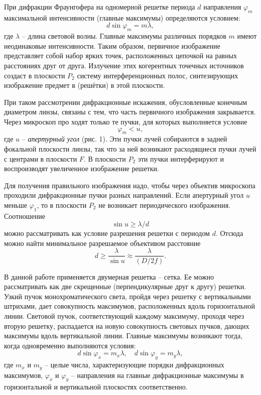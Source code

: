\documentclass[a4paper,12pt]{article}
\begin{document}
При дифракции Фраунгофера на одномерной решетке периода $d$ направления $\varphi_m$ 
 максимальной интенсивности (главные максимумы) определяются условием:
\begin{equation}\label{eq: max condition Fraunhofer diffraction}
     d\sin\varphi_m = m\lambda,
\end{equation}
где $\lambda$ -- длина световой волны. Главные максимумы различных порядков $m$ имеют неодинаковые интенсивности. Таким образом, первичное изображение представляет собой набор ярких точек, расположенных цепочкой на равных расстояниях друг от друга. Излучение этих когерентных точечных источников создаст в плоскости $P_2$ систему интерференционных полос, синтезирующих изображение предмет в (решётки) в этой плоскости.

При таком рассмотрении дифракционные искажения, обусловленные конечным диаметром линзы, связаны с тем, что часть первичного изображения закрывается. Через микроскоп про ходят только те пучки, для которых выполняется условие
\begin{equation}\label{eq: microscope aperture}
     \varphi_m < u,
\end{equation}
где $u$ -- \textit{апертурный угол} (рис. 1). Эти пучки лучей собираются в задней фокальной плоскости линзы, так что за ней возникают расходящиеся пучки лучей с центрами в плоскости $F$. В плоскости $P_2$ эти пучки интерферируют и воспроизводят увеличенное изображение решетки.

Для получения правильного изображения надо, чтобы через объектив микроскопа проходили дифракционные пучки разных направлений. Если апертурный угол $u$ меньше $\varphi_1$, то в плоскости $P_2$ не возникает периодического изображения. Соотношение
\begin{equation}\label{eq: Fraunhofer diffraction grid period condition}
    \sin u \geq \lambda / d
\end{equation}
можно рассматривать как условие разрешения решетки с периодом $d$. Отсюда можно найти минимальное разрешаемое объективом расстояние
\begin{equation}\label{eq: min resolving distance}
    d \geq \frac{\lambda}{\sin u} \approx \frac{\lambda}{(D / 2f)}.
\end{equation}

В данной работе применяется двумерная решетка -- сетка. Ее можно рассматривать как две скрещенные (перпендикулярные друг к другу) решетки. Узкий пучок монохроматического света, пройдя через решетку с вертикальными штрихами, дает совокупность максимумов, расположенных вдоль горизонтальной линии. Световой пучок, соответствующий каждому максимуму, проходя через вторую решетку, распадается на новую совокупность световых пучков, дающих максимумы вдоль вертикальной линии. Главные максимумы возникают тогда, когда одновременно выполняются условия:
\begin{equation}
    d\sin\varphi_x = m_x \lambda, \quad d\sin\varphi_y = m_y \lambda,
\end{equation}
где $m_x$ и $m_y$ -- целые числа, характеризующие порядки дифракционных максимумов, $\varphi_x$ и $\varphi_y$ -- направления на главные дифракционные максимумы в горизонтальной и вертикальной плоскостях соответственно. 
\end{document}
